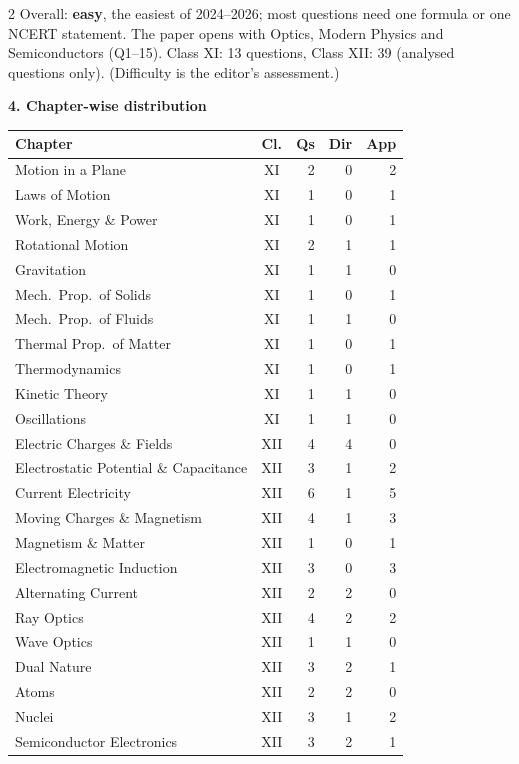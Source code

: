 \begin{multicols}{2}
{\footnotesize Overall: \textbf{easy}, the easiest of 2024--2026; most questions need one formula or one NCERT statement. The paper opens with Optics, Modern Physics and Semiconductors (Q1--15). Class XI: 13 questions, Class XII: 39 (analysed questions only). (Difficulty is the editor's assessment.)}\par\medskip
\columnbreak
\textbf{\color{crimson}4. Chapter-wise distribution}\par\smallskip
{\footnotesize\begin{tabular}{@{}p{4.7cm}c@{\,}r@{\,}r@{\,}r@{}}\toprule
Chapter & Cl. & Qs & Dir & App\\\midrule
Motion in a Plane & XI & 2 & 0 & 2\\
Laws of Motion & XI & 1 & 0 & 1\\
Work, Energy \& Power & XI & 1 & 0 & 1\\
Rotational Motion & XI & 2 & 1 & 1\\
Gravitation & XI & 1 & 1 & 0\\
Mech.\ Prop.\ of Solids & XI & 1 & 0 & 1\\
Mech.\ Prop.\ of Fluids & XI & 1 & 1 & 0\\
Thermal Prop.\ of Matter & XI & 1 & 0 & 1\\
Thermodynamics & XI & 1 & 0 & 1\\
Kinetic Theory & XI & 1 & 1 & 0\\
Oscillations & XI & 1 & 1 & 0\\
Electric Charges \& Fields & XII & 4 & 4 & 0\\
Electrostatic Potential \& Capacitance & XII & 3 & 1 & 2\\
Current Electricity & XII & 6 & 1 & 5\\
Moving Charges \& Magnetism & XII & 4 & 1 & 3\\
Magnetism \& Matter & XII & 1 & 0 & 1\\
Electromagnetic Induction & XII & 3 & 0 & 3\\
Alternating Current & XII & 2 & 2 & 0\\
Ray Optics & XII & 4 & 2 & 2\\
Wave Optics & XII & 1 & 1 & 0\\
Dual Nature & XII & 3 & 2 & 1\\
Atoms & XII & 2 & 2 & 0\\
Nuclei & XII & 3 & 1 & 2\\
Semiconductor Electronics & XII & 3 & 2 & 1\\
\bottomrule\end{tabular}}\par\medskip

\end{multicols}
